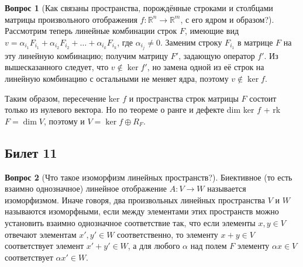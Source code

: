\documentclass[a4paper,11pt]{article}
\theoremstyle{remark}
\theoremstyle{definition}
\newtheorem{question}{Вопрос}
\numberwithin{question}{subsection}
\begin{document}
\begin{question}[Как связаны пространства, порождённые строками и столбцами матрицы произвольного отображения \(f: \mathbb{R}^n \rightarrow \mathbb{R}^m\), с его ядром и образом?]
Рассмотрим теперь линейные комбинации строк \(F\), имеющие вид \(v = \alpha_{i_1} F_{i_1} + \alpha_{i_2} F_{i_2} + \dots + \alpha_{i_k} F_{i_k}\), где \(\alpha_{i_j} \neq 0\). Заменим строку \(F_{i_1}\) в матрице \(F\) на эту линейную комбинацию; получим матрицу \(F'\), задающую оператор \(f'\). Из вышесказанного следует, что \(v \notin \ker f'\), но замена одной из её строк на линейную комбинацию с остальными не меняет ядра, поэтому \(v \notin \ker f\).

Таким образом, пересечение ker \(f\) и пространства строк матрицы \(F\) состоит только из нулевого вектора. Но по теореме о ранге и дефекте dim ker \(f\) + rk \(F = \dim V\), поэтому и \(V = \ker f \oplus R_F\). 
\end{question}


\subsection{Билет 11}
\begin{question}[Что такое изоморфизм линейных пространств?]
Биективное (то есть взаимно однозначное) линейное отображение \(A: V \rightarrow W\) называется изоморфизмом. Иначе говоря, два произвольных линейных пространства \(V\) и \(W\) называются изоморфными, если между элементами этих пространств можно установить взаимно однозначное соответствие так, что если элементы \(x, y \in V\) отвечают элементам \(x', y' \in W\) соответственно, то элементу \(x + y \in V\) соответствует элемент \(x' + y' \in W\), а для любого \(\alpha\) над полем \(F\) элементу \(\alpha{}x \in V\) соответствует \(\alpha{}x' \in W\).
\end{question}
\end{document}
